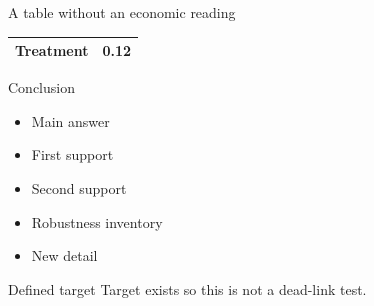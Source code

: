 \documentclass[11pt, aspectratio=169]{beamer}
\begin{document}
\begin{frame}{A table without an economic reading}
  \centering
  \begin{tabular}{lc}
    \toprule
    Treatment & 0.12 \\
    \bottomrule
  \end{tabular}
\end{frame}

\begin{frame}{Conclusion}
  \begin{itemize}
    \item Main answer
    \item First support
    \item Second support
    \item Robustness inventory
    \item New detail
  \end{itemize}
\end{frame}
\begin{frame}{Defined target}
  \hypertarget{app:existing}{}Target exists so this is not a dead-link test.
\end{frame}
\end{document}
